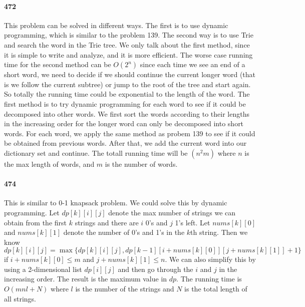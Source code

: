\documentclass[11pt]{article}
\begin{document}
\begin{itemize}
\paragraph{472}
This problem can be solved in different ways. The first is to use dynamic programming, which is similar to the problem 139.
The second way is to use Trie and search the word in the Trie tree. We only talk about the first method, since it is simple 
to write and analyze, and it is more efficient. The worse case running time for the second method can be $O(2^n)$ since 
each time we see an end of a short word, we need to decide if we should continue the current longer word (that is we follow 
the current subtree) or jump to the root of the tree and start again. So totally the running time could be exponential to the
length of the word. The first method is to try dynamic programming for each word to see if it could be decomposed into other 
words. We first sort the words according to their lengths in the increasing order for the longer word can only be decomposed 
into short words. For each word, we apply the same method as probem 139 to see if it could be obtained from previous words. 
After that, we add the current word into our dictionary set and continue. The totall running time will be $(n^2m)$ where $n$ 
is the max length of words, and $m$ is the number of words.

\paragraph{474}
This is similar to 0-1 knapsack problem. We could solve this by dynamic programming. Let $dp[k][i][j]$ denote the max number 
of strings we can obtain from the first $k$ strings and there are $i$ 0's and $j$ 1's left. Let $nums[k][0]$ and $nums[k][1]$ 
denote the number of 0's and 1's in the $k$th string.
Then we know $dp[k][i][j] = \max \{ dp[k][i][j], dp[k-1][i+nums[k][0]][j+nums[k][1]]+1 \}$ if $i+nums[k][0] \le m$ and 
$j+nums[k][1] \le n$. We can also simplify this by using a 2-dimensional list $dp[i][j]$ and then go through the $i$ and $j$ 
in the increasing order. The result is the maximum value in $dp$.
The running time is $O(mnl+N)$ where $l$ is the number of the strings and $N$ is the total length of
all strings.



\end{itemize}
\end{document}
